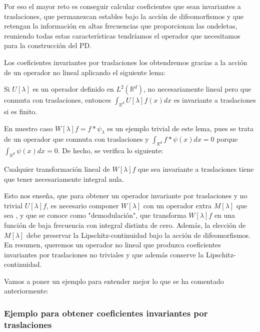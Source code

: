 \noindent Por eso el mayor reto es conseguir calcular coeficientes que sean invariantes a traslaciones, que permanezcan estables bajo la acción de difeomorfismos y que retengan la información en altas frecuencias que proporcionan las ondeletas, reuniendo todas estas características tendríamos el operador que necesitamos para la construcción del PD. 

\medskip 

\noindent Los coeficientes invariantes por traslaciones los obtendremos gracias a la acción de un operador no lineal aplicando el siguiente lema: 

\begin{lema}
  Si $U[\lambda]$ es un operador definido en $L^2(\mathbb{R}^d)$, no necesariamente lineal pero que conmuta con traslaciones, entonces $\int_{\mathbb{R}^d} U[\lambda]f(x)dx$ es invariante a traslaciones si es finito.
\end{lema}


\noindent En nuestro caso $W[\lambda]f=f\ast\psi_\lambda$ es un ejemplo trivial de este lema, pues se trata de un operador que conmuta con traslaciones y $\int_{\mathbb{R}^d} f \ast \psi(x) dx=0$ porque $\int_{\mathbb{R}^d} \psi(x)dx=0$. De hecho, se verifica lo siguiente: 

\begin{lema}
  Cualquier transformación lineal de $W[\lambda]f$ que sea invariante a traslaciones tiene que tener necesariamente integral nula.
\end{lema}

\noindent Esto nos enseña, que para obtener un operador invariante por traslaciones y no trivial $U[\lambda]f$, es necesario componer $W[\lambda]$ con un operador extra $M[\lambda]$ que sea , y que se conoce como "demodulación", que transforma $W[\lambda]f$ en una función de baja frecuencia con integral distinta de cero. Además, la elección de $M[\lambda]$ debe preservar la Lipschitz-continuidad bajo la acción de difeomorfismos.    
En resumen, queremos un operador no lineal que produzca coeficientes invariantes por traslaciones no triviales y que además conserve la Lipschitz-continuidad.


\medskip

\noindent Vamos a poner un ejemplo para entender mejor lo que se ha comentado anteriormente: 

\subsubsection{Ejemplo para obtener coeficientes invariantes por traslaciones}

